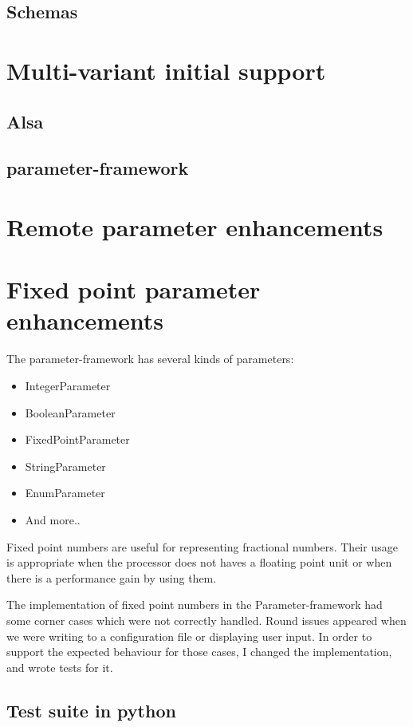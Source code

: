 \subsection{Schemas}

\section{Multi-variant initial support}
\subsection{Alsa}
\subsection{parameter-framework}

\section{Remote parameter enhancements}

\section{Fixed point parameter enhancements}
The parameter-framework has several kinds of parameters:
\begin{itemize}
    \item IntegerParameter
    \item BooleanParameter
    \item FixedPointParameter
    \item StringParameter
    \item EnumParameter
    \item And more..
\end{itemize}

Fixed point numbers are useful for representing fractional numbers. Their usage
is appropriate when the processor does not haves a floating point unit or when
there is a performance gain by using them.

The implementation of fixed point numbers in the Parameter-framework had some
corner cases which were not correctly handled. Round issues appeared when we
were writing to a configuration file or displaying user input. In order to
support the expected behaviour for those cases, I changed the implementation, and
wrote tests for it.

\subsection{Test suite in python}

